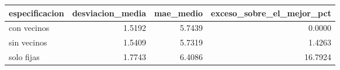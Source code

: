 \begin{tabular}{lrrr}
\toprule
especificacion & desviacion\_media & mae\_medio & exceso\_sobre\_el\_mejor\_pct \\
\midrule
con vecinos & 1.5192 & 5.7439 & 0.0000 \\
sin vecinos & 1.5409 & 5.7319 & 1.4263 \\
solo fijas & 1.7743 & 6.4086 & 16.7924 \\
\bottomrule
\end{tabular}
